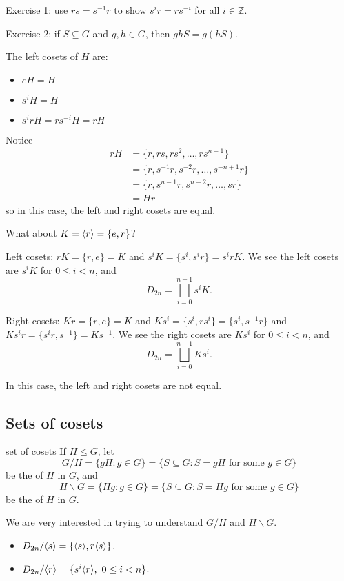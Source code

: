 \documentclass[12pt,letterpaper]{report}
\begin{document}
Exercise 1: use $rs = s^{-1}r$ to show $s^i r = rs^{-i}$ for all $i \in \mathbb{Z}$.

Exercise 2: if $S \subseteq G$ and $g, h \in G$, then $ghS = g(hS)$.

The left cosets of $H$ are:
\begin{itemize}
  \item $eH = H$
  \item $s^i H = H$
  \item $s^i r H = rs^{-i}H = rH$
\end{itemize}

Notice
\begin{align*}
  rH &= \{r, rs, rs^2, \ldots, rs^{n - 1}\} \\
  &= \{r, s^{-1}r, s^{-2}r, \ldots, s^{-n + 1}r\} \\
  &= \{r, s^{n - 1}r, s^{n - 2}r, \ldots, sr\} \\
  &= Hr
\end{align*}
so in this case, the left and right cosets are equal.

What about $K = \langle r\rangle = \{e, r\}$?

Left cosets: $rK = \{r, e\} = K$ and $s^iK = \{s^i, s^i r\} = s^i rK$.
We see the left cosets are $s^i K$ for $0 \leq i < n$, and
\[ D_{2n} = \bigsqcup_{i = 0}^{n - 1} s^i K. \]

Right cosets: $Kr = \{r, e\} = K$ and $Ks^i = \{s^i, rs^i\} = \{s^i, s^{-1}r\}$ and
$Ks^i r = \{s^i r, s^{-1}\} = Ks^{-1}$.
We see the right cosets are $K s^i$ for $0 \leq i < n$, and
\[ D_{2n} = \bigsqcup_{i = 0}^{n - 1} Ks^i. \]

In this case, the left and right cosets are not equal.

\pagebreak
\subsection{Sets of cosets}

\begin{defn}{set of cosets}{}
  If $H \leq G$, let
  \[ G/H = \{gH : g \in G\} = \{S \subseteq G: S = gH \text{ for some } g \in G\} \]
  be the  of $H$ in $G$, and
  \[ H \backslash G = \{Hg: g \in G\} = \{S \subseteq G : S = Hg \text{ for some } g \in G\} \]
  be the  of $H$ in $G$.
\end{defn}

We are very interested in trying to understand $G/H$ and $H \backslash G$.

\begin{ex}
  \begin{itemize}
    \item $D_{2n} / \langle s\rangle = \{\langle s\rangle, r\langle s\rangle\}$.
    \item $D_{2n} / \langle r\rangle = \{s^i \langle r\rangle, \ 0 \leq i < n\}$.
  \end{itemize}
\end{ex}
\end{document}
